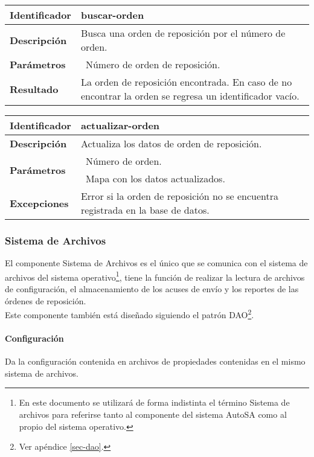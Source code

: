 	\begin{longtable}{|p{}|p{}|}
		\hline
		\textbf{Identificador}	& \textbf{buscar-orden}\\
		\hline
		\hline
		\textbf{Descripción}	& Busca una orden de reposición por el número de orden.\\
		\hline
		\textbf{Parámetros}		& \textbullet\, Número de orden de reposición.\\
		\hline
		\textbf{Resultado}		& La orden de reposición encontrada. En caso de no encontrar la orden se regresa un identificador vacío.\\
		\hline
	\end{longtable}

	\begin{longtable}{|p{}|p{}|}
		\hline
		\textbf{Identificador}	& \textbf{actualizar-orden}\\
		\hline
		\hline
		\textbf{Descripción}	& Actualiza los datos de orden de reposición.\\
		\hline
		\multirow{2}{*}{\textbf{Parámetros}}	& \textbullet\, Número de orden.\\
												& \textbullet\, Mapa con los datos actualizados.\\
		\hline
		\textbf{Excepciones}	& Error si la orden de reposición no se encuentra registrada en la base de datos.\\
		\hline
	\end{longtable}

\subsubsection{Sistema de Archivos}
El componente Sistema de Archivos es el único que se comunica con el sistema de archivos del sistema operativo\footnote{En este documento se utilizará de forma indistinta el término Sistema de archivos para referirse tanto al componente del sistema AutoSA como al propio del sistema operativo.}, tiene la función de realizar la lectura de archivos de configuración, el almacenamiento de los acuses de envío  y los reportes de las órdenes de reposición.\\
Este componente también está diseñado siguiendo el patrón DAO\footnote{Ver apéndice \ref{sec-dao}.}.
\paragraph{Configuración\\}
Da la configuración contenida en archivos de propiedades contenidas en el mismo sistema de archivos.

